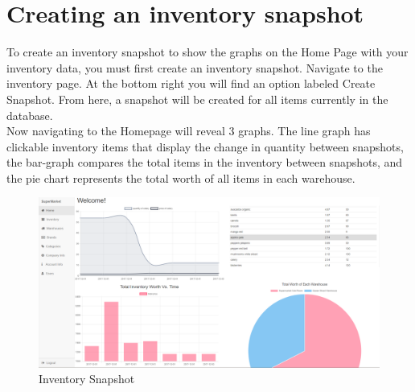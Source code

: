 \documentclass[12pt, titlepage]{article}
\begin{document}
\section{Creating an inventory snapshot}
\label{sec:snapshot}
To create an inventory snapshot to show the graphs on the Home Page with your inventory data, you must first create an inventory snapshot. Navigate to the inventory page. At the bottom right you will find an option labeled Create Snapshot. From here, a snapshot will be created for all items currently in the database.\\

Now navigating to the Homepage will reveal 3 graphs. The line graph has clickable inventory items that display the change in quantity between snapshots, the bar-graph compares the total items in the inventory between snapshots, and the pie chart represents the total worth of all items in each warehouse.

\begin{figure}[h]
\centering
\includegraphics[width=\linewidth]{sims4.PNG}
\caption{Inventory Snapshot}
\label{fig:figure5}
\end{figure}
\end{document}
